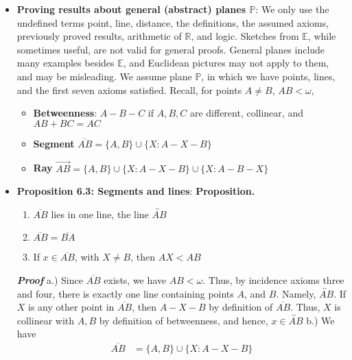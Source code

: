 \documentclass{report}
\begin{document}
\begin{itemize}
        \item \textbf{Proving results about general (abstract) planes $\mathbb{P}$}: We only use the undefined terms point, line, distance, the definitions, the assumed axioms, previously proved results, arithmetic of $\mathbb{R}$, and logic.
            \bigbreak \noindent 
            Sketches from $\mathbb{E}$, while sometimes useful, are not valid for general proofs. General planes include many examples besides $\mathbb{E}$, and Euclidean pictures may not apply to them, and may be misleading.
            \bigbreak \noindent 
            We assume plane $\mathbb{P}$, in which we have points, lines, and the first seven axioms satisfied.
            \bigbreak \noindent 
            Recall, for points $A\ne B$, $AB < \omega$,
            \begin{itemize}
                \item \textbf{Betweenness}: $A-B-C$ if $A,B,C$ are different, collinear, and $AB + BC = AC $
                \item \textbf{Segment} $\overline{AB} = \{A,B\} \cup \{X: A-X-B\}$
                \item \textbf{Ray} $\overrightarrow{AB} = \{A,B\} \cup \{X: A-X-B\} \cup \{X: A-B-X\}  $
            \end{itemize}
        \item \textbf{Proposition 6.3: Segments and lines}:
            \bigbreak \noindent 
            \textbf{Proposition.}
            \begin{enumerate}[label=(\alph*)]
                \item $\overline{AB}$ lies in one line, the line $\overleftrightarrow{AB} $
                \item $\overline{AB} = \overline{BA} $
                \item If $x\in \overline{AB}$, with $X \ne B$, then $AX < AB $
            \end{enumerate}
            \bigbreak \noindent 
            \textbf{\textit{Proof}} a.) Since $\overline{AB}$ exists, we have $AB < \omega$. Thus, by incidence axioms three and four, there is exactly one line containing points $A$, and $B$. Namely, $\overleftrightarrow{AB} $. If $X$ is any other point in $\overline{AB}$, then $A-X-B$ by definition of $\overline{AB}$. Thus, $X$ is collinear with $A,B$ by definition of betweenness, and hence, $x \in \overleftrightarrow{AB}$
            \bigbreak \noindent 
            b.) We have
            \begin{align*}
                \overline{AB} &= \{A,B\} \cup \{X: A-X-B\} \tag{1}\\

\end{align*}
\end{itemize}
\end{document}
